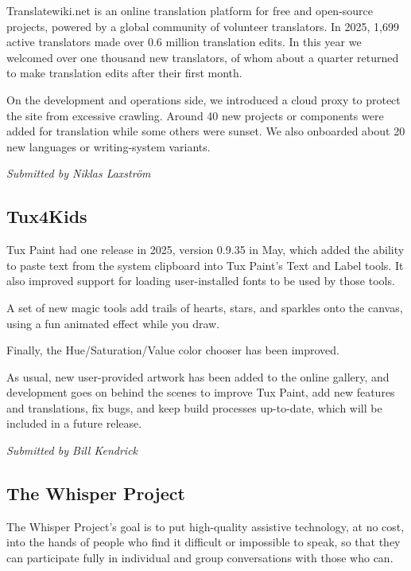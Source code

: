 \documentclass[a4paper]{report}
\begin{document}
Translatewiki.net is an online translation platform for free and open-source projects, powered by a global community of volunteer translators. In 2025, 1,699 active translators made over 0.6 million translation edits. In this year we welcomed over one thousand new translators, of whom about a quarter returned to make translation edits after their first month.

On the development and operations side, we introduced a cloud proxy to protect the site from excessive crawling. Around 40 new projects or components were added for translation while some others were sunset. We also onboarded about 20 new languages or writing-system variants.

{\em Submitted by Niklas Laxström}

\subsection{Tux4Kids}

Tux Paint had one release in 2025, version 0.9.35 in May, which added the ability to paste text from the system clipboard into Tux Paint's Text and Label tools. It also improved support for loading user-installed fonts to be used by those tools.

A set of new magic tools add trails of hearts, stars, and sparkles onto the canvas, using a fun animated effect while you draw.

Finally, the Hue/Saturation/Value color chooser has been improved.

As usual, new user-provided artwork has been added to the online gallery, and development goes on behind the scenes to improve Tux Paint, add new features and translations, fix bugs, and keep build processes up-to-date, which will be included in a future release.

{\em Submitted by Bill Kendrick}

\subsection{The Whisper Project}

The Whisper Project's goal is to put high-quality assistive technology, at no cost, into the hands of people who find it difficult or impossible to speak, so that they can participate fully in individual and group conversations with those who can.
\end{document}
